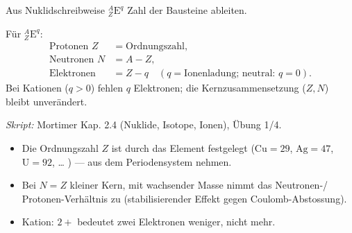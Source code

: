 

Aus Nuklidschreibweise ${}^A_Z\mathrm{E}^{q}$ Zahl der Bausteine ableiten.

\begin{werkzeugkasten}
Für ${}^A_Z\mathrm{E}^{q}$:
\begin{align}
  \text{Protonen } Z &= \text{Ordnungszahl},\\
  \text{Neutronen } N &= A - Z,\\
  \text{Elektronen} &= Z - q \quad (q=\text{Ionenladung; neutral: }q=0).
\end{align}
Bei Kationen ($q>0$) fehlen $q$ Elektronen; die Kernzusammensetzung ($Z,N$)
bleibt unverändert.

\textit{Skript:} Mortimer Kap. 2.4 (Nuklide, Isotope, Ionen), Übung 1/4.
\end{werkzeugkasten}

\begin{achtung}
\begin{itemize}
  \item Die Ordnungszahl $Z$ ist durch das Element festgelegt
        ($\mathrm{Cu}=29$, $\mathrm{Ag}=47$, $\mathrm{U}=92$, \dots{} ) --- aus dem
        Periodensystem nehmen.
  \item Bei $N=Z$ kleiner Kern, mit wachsender Masse nimmt das Neutronen-/
        Protonen-Verhältnis zu (stabilisierender Effekt gegen Coulomb-Abstossung).
  \item Kation: $2+$ bedeutet zwei Elektronen weniger, nicht mehr.
\end{itemize}
\end{achtung}
